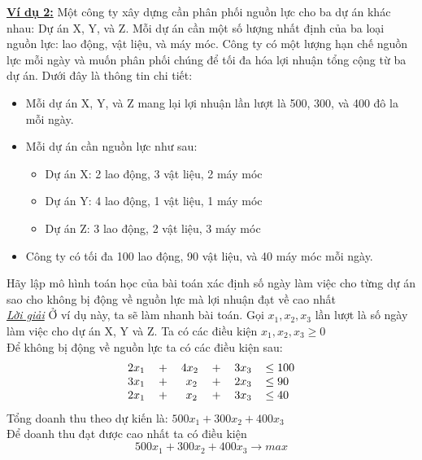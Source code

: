 \documentclass{article}
\begin{document}
\textbf{\underline{Ví dụ 2:}} Một công ty xây dựng cần phân phối nguồn lực cho ba dự án khác nhau: Dự án X, Y, và Z. Mỗi dự án cần một số lượng nhất định của ba loại nguồn lực: lao động, vật liệu, và máy móc. Công ty có một lượng hạn chế nguồn lực mỗi ngày và muốn phân phối chúng để tối đa hóa lợi nhuận tổng cộng từ ba dự án. Dưới đây là thông tin chi tiết:
\begin{itemize}
    \item Mỗi dự án X, Y, và Z mang lại lợi nhuận lần lượt là 500, 300, và 400 đô la mỗi ngày.
    \item Mỗi dự án cần nguồn lực như sau:
    \begin{itemize}
        \item Dự án X: 2 lao động, 3 vật liệu, 2 máy móc
        \item Dự án Y: 4 lao động, 1 vật liệu, 1 máy móc
        \item Dự án Z: 3 lao động, 2 vật liệu, 3 máy móc
    \end{itemize}
    \item Công ty có tối đa 100 lao động, 90 vật liệu, và 40 máy móc mỗi ngày.
\end{itemize}
\hspace{0.4cm} Hãy lập mô hình toán học của bài toán xác định số ngày làm việc cho từng dự án sao cho không bị động về nguồn lực mà lợi nhuận đạt về cao nhất\medskip \\
\underline{\textit{Lời giải}} Ở ví dụ này, ta sẽ làm nhanh bài toán. 
Gọi $x_1, x_2, x_3$ lần lượt là số ngày làm việc cho dự án X, Y và Z. Ta có các điều kiện $x_1, x_2, x_3 \geq 0$ \medskip \\
\indent Để không bị động về nguồn lực ta có các điều kiện sau:
\begin{equation*}
    \begin{tabular}{c c c c c l}
        $2x_1$ &$+$ & $4x_2$ & $+$ & $3x_3$ &$\leq 100$  \\
        $3x_1$ &$+$ & \text{ }$x_2$   & $+$ & $2x_3$ &$\leq 90$ \\
        $2x_1$ &$+$ & \text{ }$x_2$   & $+$ & $3x_3$ &$\leq 40$ \\
    \end{tabular}
\end{equation*}
\indent Tổng doanh thu theo dự kiến là: $500x_1+300x_2+400x_3$ \medskip \\
\indent Để doanh thu đạt được cao nhất ta có điều kiện
\begin{equation*}
    500x_1+300x_2+400x_3 \longrightarrow max
\end{equation*}
\end{document}
